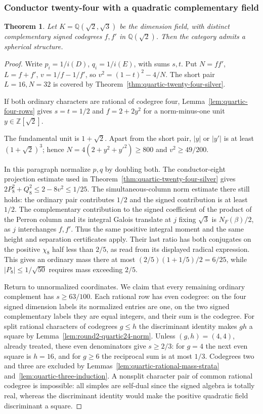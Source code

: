\documentclass[11pt,reqno]{amsart}
\newtheorem{theorem}{Theorem}[section]
\theoremstyle{remark}\newtheorem{remark}[theorem]{Remark}
\numberwithin{equation}{section}
\begin{document}
\subsubsection{Conductor twenty-four with a quadratic complementary field}
\begin{theorem}\label{prop:quartic-twenty-four-silver-general}
Let $K=\mathbb Q(\sqrt2,\sqrt3)$ be the dimension field, with distinct
complementary signed codegrees $f,f'$ in $\mathbb Q(\sqrt2)$.
Then the category admits a spherical structure.
\end{theorem}
\begin{proof}
Write $p_i=1/i(D)$, $q_i=1/i(E)$, with sums $s,t$.
Put $N=ff'$, $L=f+f'$, $v=1/f-1/f'$, so $v^2=(1-t)^2-4/N$.
The short pair $L=16,N=32$ is covered by
Theorem~\ref{thm:quartic-twenty-four-silver}.

If both ordinary characters are rational of codegree four,
Lemma~\ref{lem:quartic-four-rows} gives $s=t=1/2$ and
$f=2+2y^2$ for a norm-minus-one unit $y\in\mathbb Z[\sqrt2]$.

The fundamental unit is $1+\sqrt2$. Apart from the short pair,
$|y|$ or $|y'|$ is at least $(1+\sqrt2)^3$; hence
$N=4(2+y^2+y'^2)\ge800$ and $v^2\ge49/200$.

In this paragraph normalize $p,q$ by doubling both. The
conductor-eight projection estimate used in Theorem~\ref{thm:quartic-twenty-four-silver}
gives $2P_8^2+Q_8^2\le2-8v^2\le1/25$.
The simultaneous-column norm estimate there still holds: the ordinary
pair contributes $1/2$ and the signed contribution is at least $1/2$.
The complementary contribution to the signed coefficient of the product of the Perron
column and its integral Galois translate at $j$ fixing $\sqrt3$ is
$N_F(\beta)/2$,
as $j$ interchanges $f,f'$. Thus the same positive integral
moment and the same height and separation certificates apply. Their last
ratio has both conjugates on the positive $\chi_8$ half less than $2/5$,
as read from its displayed radical expression. This gives an ordinary
mass there at most $(2/5)(1+1/5)/2=6/25$, while
$|P_8|\le1/\sqrt{50}$ requires mass exceeding $2/5$.

Return to unnormalized coordinates. We claim that every remaining
ordinary complement has $s\ge63/100$. Each rational row has even
codegree: on the four signed dimension labels its normalized entries
are one, on the two signed complementary labels they are equal
integers, and their sum is the codegree. For split rational
characters of codegrees $g\le h$ the discriminant identity makes
$gh$ a square by Lemma~\ref{lem:round2-quartic24-norm}. Unless
$(g,h)=(4,4)$, already treated, these even denominators give
$s\ge2/3$: for $g=4$ the next even square is $h=16$, and for
$g\ge6$ the reciprocal sum is at most $1/3$. Codegrees two and
three are excluded by Lemmas~\ref{lem:quartic-rational-mass-strata}
and~\ref{lem:quartic-three-induction}.
A nonsplit character pair of common rational codegree is impossible:
all simples are self-dual since the signed algebra is totally real,
whereas the discriminant identity would make the positive
quadratic field discriminant a square.


\end{proof}
\end{document}
